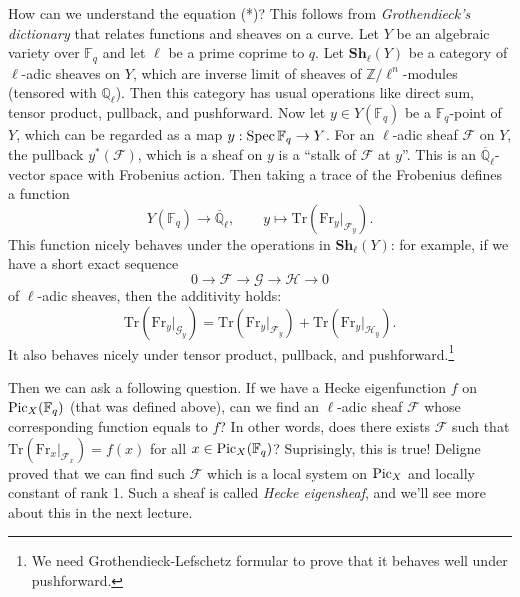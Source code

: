 How can we understand the equation (*)? This follows from \emph{Grothendieck's dictionary}
that relates functions and sheaves on a curve.
Let $Y$ be an algebraic variety over $\mathbb{F}_{q}$ and let $\ell$ be a prime coprime to $q$. 
Let $\mathbf{Sh}_{\ell}(Y)$ be a category of $\ell$-adic sheaves on $Y$, which are inverse limit of sheaves of $\mathbb{Z}/\ell^n$-modules (tensored with $\mathbb{Q}_\ell$).
Then this category has usual operations like direct sum, tensor product, pullback, and pushforward.
Now let $y \in Y(\mathbb{F}_{q})$ be a $\mathbb{F}_{q}$-point of $Y$, which can be regarded as a map $y: \operatorname{\mathrm{Spec}} \mathbb{F}_q \to Y$.
For an $\ell$-adic sheaf $\mathcal{F}$ on $Y$, the pullback $y^{*}(\mathcal{F})$, which is a sheaf on $y$ is a ``stalk of $\mathcal{F}$ at $y$''.
This is an $\overline{\mathbb{Q}}_{\ell}$-vector space with Frobenius action.
Then taking a trace of the Frobenius defines a function 
$$
Y(\mathbb{F}_q) \to \overline{\mathbb{Q}}_{\ell}, \qquad y\mapsto \mathrm{Tr}(\mathrm{Fr}_{y}|_{\mathcal{F}_{y}}).
$$
This function nicely behaves under the operations in $\mathbf{Sh}_{\ell}(Y)$: for example, if we have a short exact sequence
$$
0 \to \mathcal{F} \to \mathcal{G} \to \mathcal{H} \to 0
$$
of $\ell$-adic sheaves, then the additivity holds: 
$$
\mathrm{Tr}(\mathrm{Fr}_{y}|_{\mathcal{G}_{y}}) = \mathrm{Tr}(\mathrm{Fr}_{y}|_{\mathcal{F}_{y}}) + \mathrm{Tr}(\mathrm{Fr}_{y}|_{\mathcal{H}_{y}}).
$$
It also behaves nicely under tensor product, pullback, and pushforward.\footnote{We need Grothendieck-Lefschetz formular to prove that it behaves well under pushforward.}

Then we can ask a following question. 
If we have a Hecke eigenfunction $f$ on $\operatorname{\mathrm{Pic}}_X(\mathbb{F}_{q})$ (that was defined above), can we find an $\ell$-adic sheaf $\mathcal{F}$ whose corresponding function
equals to $f$?
In other words, does there exists $\mathcal{F}$ such that $\mathrm{Tr}(\mathrm{Fr}_x|_{\mathcal{F}_x}) = f(x)$ for all $x\in \operatorname{\mathrm{Pic}}_X (\mathbb{F}_q)$?
Suprisingly, this is true! Deligne proved that we can find such $\mathcal{F}$ which is a local system on $\operatorname{\mathrm{Pic}}_X$ and locally constant of rank 1.
Such a sheaf is called \emph{Hecke eigensheaf}, and we'll see more about this in the next lecture.


